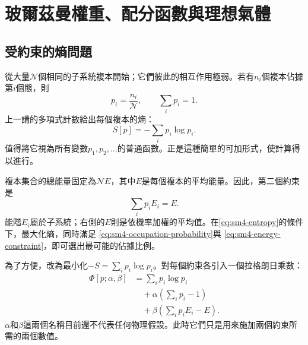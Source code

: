 \chapter{玻爾茲曼權重、配分函數與理想氣體}


\section{受約束的熵問題}

從大量\(\mathcal N\)個相同的子系統複本開始；它們彼此的相互作用極弱。若有\(n_i\)個複本佔據第\(i\)個態，則
\begin{equation}
 p_i=\frac{n_i}{\mathcal N},
 \qquad
 \sum_i p_i=1.
 \label{eq:sm4-occupation-probability}
\end{equation}
上一講的多項式計數給出每個複本的熵：
\begin{equation}
 S[p]=-\sum_i p_i\log p_i.
 \label{eq:sm4-entropy}
\end{equation}
值得將它視為所有變數\(p_1,p_2,\ldots\)的普通函數。正是這種簡單的可加形式，使計算得以進行。

複本集合的總能量固定為\(\mathcal N E\)，其中\(E\)是每個複本的平均能量。因此，第二個約束是
\begin{equation}
 \sum_i p_iE_i=E.
 \label{eq:sm4-energy-constraint}
\end{equation}
能階\(E_i\)屬於子系統；右側的\(E\)則是依機率加權的平均值。在\eqref{eq:sm4-entropy}的條件下，最大化熵，同時滿足
\eqref{eq:sm4-occupation-probability}與
\eqref{eq:sm4-energy-constraint}，即可選出最可能的佔據比例。

為了方便，改為最小化\(-S=\sum_i p_i\log p_i\)。對每個約束各引入一個拉格朗日乘數：
\begin{equation}
 \begin{aligned}
 \Phi[p;\alpha,\beta]
 &=\sum_i p_i\log p_i\\
 &\quad+\alpha\left(\sum_i p_i-1\right)\\
 &\quad+\beta\left(\sum_i p_iE_i-E\right).
 \end{aligned}
 \label{eq:sm4-augmented-functional}
\end{equation}
\(\alpha\)和\(\beta\)這兩個名稱目前還不代表任何物理假設。此時它們只是用來施加兩個約束所需的兩個數值。

\begin{classroomqa}
\end{classroomqa}

